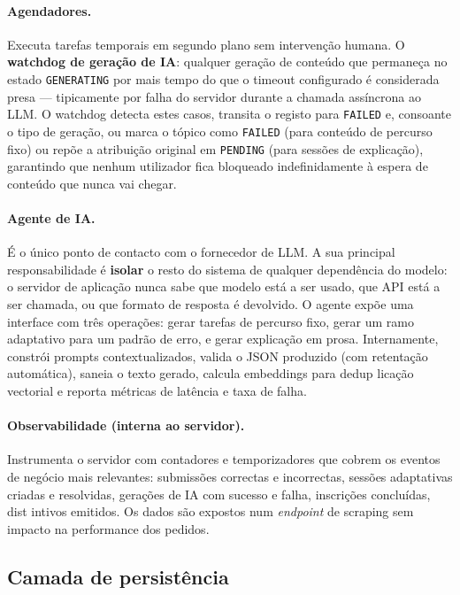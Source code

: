 \paragraph{Agendadores.}
Executa tarefas temporais em segundo plano sem interven\c{c}\~ao humana. O \textbf{watchdog de gera\c{c}\~ao de IA}:
qualquer gera\c{c}\~ao de conte\'udo que permane\c{c}a no estado
\texttt{GENERATING} por mais tempo do que o timeout configurado \'e
considerada presa --- tipicamente por falha do servidor durante a chamada
ass\'incrona ao LLM. O watchdog detecta estes casos, transita o registo
para \texttt{FAILED} e, consoante o tipo de gera\c{c}\~ao, ou marca o
t\'opico como \texttt{FAILED} (para conte\'udo de percurso fixo) ou repõe
a atribui\c{c}\~ao original em \texttt{PENDING} (para sess\~oes de
explica\c{c}\~ao), garantindo que nenhum utilizador fica bloqueado
indefinidamente \`a espera de conte\'udo que nunca vai chegar.

\paragraph{Agente de IA.}
\'E o \'unico ponto de contacto com o fornecedor de LLM. A sua principal
responsabilidade \'e \textbf{isolar} o resto do sistema de qualquer
depend\^encia do modelo: o servidor de aplica\c{c}\~ao nunca sabe que modelo
est\'a a ser usado, que API est\'a a ser chamada, ou que formato de resposta
\'e devolvido. O agente exp\~oe uma interface com tr\^es opera\c{c}\~oes:
gerar tarefas de percurso fixo, gerar um ramo adaptativo para um padr\~ao
de erro, e gerar explica\c{c}\~ao em prosa. Internamente, constr\'oi prompts
contextualizados, valida o JSON produzido (com retenta\c{c}\~ao autom\'atica),
saneia o texto gerado, calcula embeddings para dedup lica\c{c}\~ao vectorial
e reporta m\'etricas de lat\^encia e taxa de falha.

\paragraph{Observabilidade (interna ao servidor).}
Instrumenta o servidor com contadores e temporizadores que cobrem os eventos
de neg\'ocio mais relevantes: submiss\~oes correctas e incorrectas, sess\~oes
adaptativas criadas e resolvidas, gera\c{c}\~oes de IA com sucesso e falha,
inscri\c{c}\~oes conclu\'idas, dist intivos emitidos. Os dados s\~ao expostos
num \emph{endpoint} de scraping sem impacto na performance dos pedidos.

\subsection{Camada de persist\^encia}
\label{ssec:persistencia}

